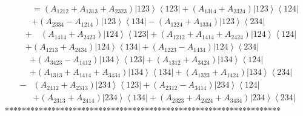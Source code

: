 \documentclass[aps,preprint]{revtex4}%
\begin{document}
\begin{align}
\quad &  =\left(  A_{1212}+A_{1313}+A_{2323}\right)  \left\vert
123\right\rangle \left\langle 123\right\vert +\left(  A_{1314}+A_{2324}%
\right)  \left\vert 123\right\rangle \left\langle 124\right\vert \nonumber\\
&  +\left(  A_{2334}-A_{1214}\right)  \left\vert 123\right\rangle \left\langle
134\right\vert -\left(  A_{1224}+A_{1334}\right)  \left\vert 123\right\rangle
\left\langle 234\right\vert
\end{align}%
\begin{align}
&  +\quad\left(  A_{1414}+A_{2423}\right)  \left\vert 124\right\rangle
\left\langle 123\right\vert +\left(  A_{1212}+A_{1414}+A_{2424}\right)
\left\vert 124\right\rangle \left\langle 124\right\vert \nonumber\\
&  +\left(  A_{1213}+A_{2434}\right)  \left\vert 124\right\rangle \left\langle
134\right\vert +\left(  A_{1223}-A_{1434}\right)  \left\vert 124\right\rangle
\left\langle 234\right\vert
\end{align}%
\begin{align}
&  +\left(  A_{3423}-A_{1412}\right)  \left\vert 134\right\rangle \left\langle
123\right\vert +\left(  A_{1312}+A_{3424}\right)  \left\vert 134\right\rangle
\left\langle 124\right\vert \nonumber\\
&  +\left(  A_{1313}+A_{1414}+A_{3434}\right)  \left\vert 134\right\rangle
\left\langle 134\right\vert +\left(  A_{1323}+A_{1424}\right)  \left\vert
134\right\rangle \left\langle 234\right\vert
\end{align}%
\begin{align}
- &  \left(  A_{2412}+A_{2313}\right)  \left\vert 234\right\rangle
\left\langle 123\right\vert +\left(  A_{2312}-A_{3414}\right)  \left\vert
234\right\rangle \left\langle 124\right\vert \nonumber\\
&  +\left(  A_{2313}+A_{2414}\right)  \left\vert 234\right\rangle \left\langle
134\right\vert +\left(  A_{2323}+A_{2424}+A_{3434}\right)  \left\vert
234\right\rangle \left\langle 234\right\vert
\end{align}
*****************************************************************%
\end{document}
